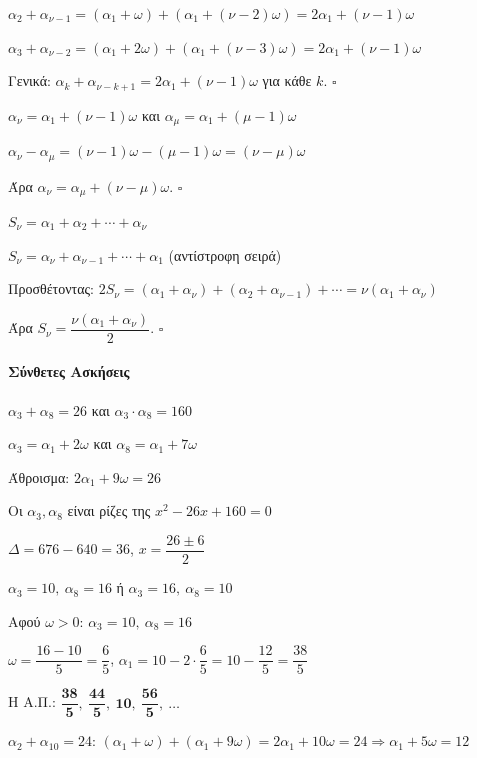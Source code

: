 \documentclass[11pt,a4paper,modern]{FFExercises}
\begin{document}
$\alpha_2+\alpha_{\nu-1}=(\alpha_1+\omega)+(\alpha_1+(\nu-2)\omega)=2\alpha_1+(\nu-1)\omega$

$\alpha_3+\alpha_{\nu-2}=(\alpha_1+2\omega)+(\alpha_1+(\nu-3)\omega)=2\alpha_1+(\nu-1)\omega$

Γενικά: $\alpha_k+\alpha_{\nu-k+1}=2\alpha_1+(\nu-1)\omega$ για κάθε $k$. \hfill $\square$

\lysh[48]
\begin{alist}
\item $\alpha_{\nu}=\alpha_1+(\nu-1)\omega$ και $\alpha_{\mu}=\alpha_1+(\mu-1)\omega$

$\alpha_{\nu}-\alpha_{\mu}=(\nu-1)\omega-(\mu-1)\omega=(\nu-\mu)\omega$

Άρα $\alpha_{\nu}=\alpha_{\mu}+(\nu-\mu)\omega$. \hfill $\square$

\item $S_{\nu}=\alpha_1+\alpha_2+\cdots+\alpha_{\nu}$

$S_{\nu}=\alpha_{\nu}+\alpha_{\nu-1}+\cdots+\alpha_1$ (αντίστροφη σειρά)

Προσθέτοντας: $2S_{\nu}=(\alpha_1+\alpha_{\nu})+(\alpha_2+\alpha_{\nu-1})+\cdots=\nu(\alpha_1+\alpha_{\nu})$

Άρα $S_{\nu}=\dfrac{\nu(\alpha_1+\alpha_{\nu})}{2}$. \hfill $\square$
\end{alist}

\paragraph{Σύνθετες Ασκήσεις}

\lysh[49]
$\alpha_3+\alpha_8=26$ και $\alpha_3\cdot\alpha_8=160$

$\alpha_3=\alpha_1+2\omega$ και $\alpha_8=\alpha_1+7\omega$

Άθροισμα: $2\alpha_1+9\omega=26$

Οι $\alpha_3,\alpha_8$ είναι ρίζες της $x^2-26x+160=0$

$\varDelta=676-640=36$, $x=\dfrac{26\pm 6}{2}$

$\alpha_3=10,\ \alpha_8=16$ ή $\alpha_3=16,\ \alpha_8=10$

Αφού $\omega>0$: $\alpha_3=10,\ \alpha_8=16$

$\omega=\dfrac{16-10}{5}=\dfrac{6}{5}$, $\alpha_1=10-2\cdot\dfrac{6}{5}=10-\dfrac{12}{5}=\dfrac{38}{5}$

Η Α.Π.: $\boldsymbol{\dfrac{38}{5},\ \dfrac{44}{5},\ 10,\ \dfrac{56}{5},\ \ldots}$

\lysh[50]
$\alpha_2+\alpha_{10}=24$: $(\alpha_1+\omega)+(\alpha_1+9\omega)=2\alpha_1+10\omega=24 \Rightarrow \alpha_1+5\omega=12$
\end{document}
